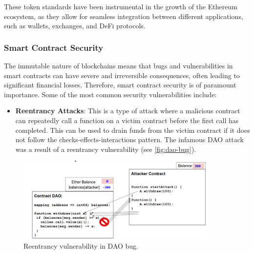 These token standards have been instrumental in the growth of the
Ethereum ecosystem, as they allow for seamless integration between
different applications, such as wallets, exchanges, and DeFi protocols.




\clearpage
\subsubsection{Smart Contract
	Security}\label{smart-contract-security}

The immutable nature of blockchains means that bugs and vulnerabilities
in smart contracts can have severe and irreversible consequences, often
leading to significant financial losses. Therefore, smart contract
security is of paramount importance. Some of the most common security
vulnerabilities include:

\begin{itemize}
	\tightlist
	\item
	\textbf{Reentrancy Attacks}: This is a type of attack where a
	malicious contract can repeatedly call a function on a victim contract
	before the first call has completed. This can be used to drain funds
	from the victim contract if it does not follow the
	checks-effects-interactions pattern. The infamous DAO attack was a
	result of a reentrancy vulnerability (see \autoref{fig:dao-bug}).
\end{itemize}


\begin{figure}[t]
	\begin{center}
		\includegraphics[width=0.9\textwidth]{./figs/DAO.png }
		\caption{Reentrancy vulnerability in DAO bug.}		
		\label{fig:dao-bug}
	\end{center}	
\end{figure}

